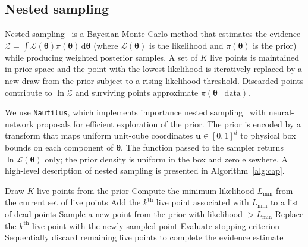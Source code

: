 \documentclass[fleqn,usenatbib]{rasti}
\begin{document}
\subsection{Nested sampling}
Nested sampling~\citep{Skilling2006} is a Bayesian Monte Carlo method that estimates the evidence $\mathcal{Z}=\int \mathcal{L}(\boldsymbol{\theta})\pi(\boldsymbol{\theta})\,\mathrm{d}\boldsymbol{\theta}$ (where $\mathcal{L}(\boldsymbol{\theta})$ is the likelihood and $\pi(\boldsymbol{\theta})$ is the prior) while producing weighted posterior samples. A set of $K$ live points is maintained in prior space and the point with the lowest likelihood is iteratively replaced by a new draw from the prior subject to a rising likelihood threshold. Discarded points contribute to $\ln\mathcal{Z}$ and  surviving points approximate $\pi(\boldsymbol{\theta}\mid\mathrm{data})$.

We use \texttt{Nautilus}, which implements importance nested sampling~\citep{Feroz_2019} with neural-network proposals for efficient exploration of the prior. The prior is encoded by a transform  that maps uniform unit-cube coordinates $\mathbf{u}\in[0,1]^d$ to physical box bounds on each component of $\boldsymbol{\theta}$. The function passed to the sampler returns $\ln\mathcal{L}(\boldsymbol{\theta})$ only; the prior density is uniform in the box and zero elsewhere. A high-level description of nested sampling is presented in Algorithm~\ref{alg:cap}.

\begin{algorithm}
\caption{Nested sampling algorithm}\label{alg:cap}
\begin{algorithmic}
\State Draw $K$ live points from the prior
\State Compute the minimum likelihood $L_{\min}$ from the current set of live points
\State Add the $k^{\mathrm{th}}$ live point associated with $L_{\min}$ to a list of dead points
\State Sample a new point from the prior with likelihood $> L_{\min}$
\State Replace the $k^{\mathrm{th}}$ live point with the newly sampled point
\State Evaluate stopping criterion
\EndWhile
\State Sequentially discard remaining live points to complete the evidence estimate
\end{algorithmic}
\end{algorithm}
\end{document}
